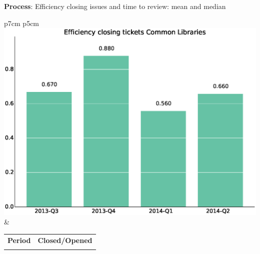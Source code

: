 \documentclass[a4wide,11pt]{report}
\begin{document}
\textbf{Process}: Efficiency closing issues and time to review: mean and median

\begin{tabular}{p{7cm} p{5cm}}
    \vspace{0pt} 
    \includegraphics[scale=.35]{figs/bmiCommonLibraries.eps}
    & 
    \vspace{0pt}
    \begin{tabular}{l|l}%
    \bfseries Period & \bfseries Closed/Opened %
    \csvreader[head to column names]{data/bmiCommonLibraries.csv}{}%
    {\\ & \bmi}
    \end{tabular}
\end{tabular}
\end{document}
